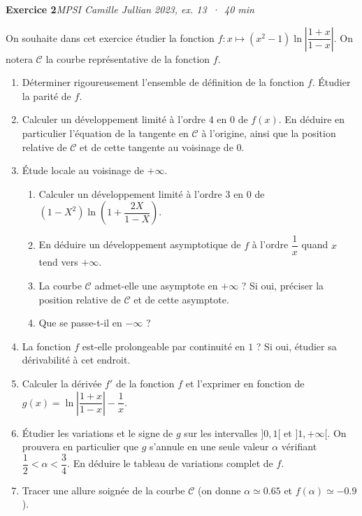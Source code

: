 \documentclass[11pt,a4paper]{article}
\newcommand{\exo}[3]{\vspace{1.1em}\noindent\textbf{\large #1}\hfill\textit{#2 \,·\, #3}\par\smallskip}
\begin{document}
\exo{Exercice 2}{MPSI Camille Jullian 2023, ex. 13}{40 min}
\noindent On souhaite dans cet exercice étudier la fonction $f : x\mapsto(x^2-1)\ln\left|\dfrac{1+x}{1-x}\right|$. On notera $\mathcal{C}$ la courbe représentative de la fonction $f$.
\begin{enumerate}
\item Déterminer rigoureusement l'ensemble de définition de la fonction $f$. Étudier la parité de $f$.
\item Calculer un développement limité à l'ordre 4 en $0$ de $f(x)$. En déduire en particulier l'équation de la tangente en $\mathcal{C}$ à l'origine, ainsi que la position relative de $\mathcal{C}$ et de cette tangente au voisinage de $0$.
\item Étude locale au voisinage de $+\infty$.
 \begin{enumerate}
 \item Calculer un développement limité à l'ordre 3 en $0$ de $(1-X^2)\ln\left(1+\dfrac{2X}{1-X}\right)$.
 \item En déduire un développement asymptotique de $f$ à l'ordre $\dfrac1x$ quand $x$ tend vers $+\infty$.
 \item La courbe $\mathcal{C}$ admet-elle une asymptote en $+\infty$ ? Si oui, préciser la position relative de $\mathcal{C}$ et de cette asymptote.
 \item Que se passe-t-il en $-\infty$ ?
 \end{enumerate}
\item La fonction $f$ est-elle prolongeable par continuité en $1$ ? Si oui, étudier sa dérivabilité à cet endroit.
\item Calculer la dérivée $f'$ de la fonction $f$ et l'exprimer en fonction de $g(x)=\ln\left|\dfrac{1+x}{1-x}\right|-\dfrac1x$.
\item Étudier les variations et le signe de $g$ sur les intervalles $]0,1[$ et $]1,+\infty[$. On prouvera en particulier que $g$ s'annule en une seule valeur $\alpha$ vérifiant $\dfrac12<\alpha<\dfrac34$. En déduire le tableau de variations complet de $f$.
\item Tracer une allure soignée de la courbe $\mathcal{C}$ (on donne $\alpha\simeq 0.65$ et $f(\alpha)\simeq-0.9$).
\end{enumerate}
\end{document}
